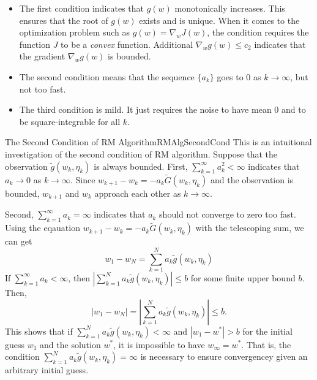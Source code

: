     \begin{itemize}
        \item The first condition indicates that $g(w)$ monotonically increases. This ensures that the root of $g(w)$ exists and is unique.
            When it comes to the optimization problem such as $g(w) = \nabla_w J(w)$, the condition requires the function $J$ to be a \emph{convex} function.
            Additional $\nabla_w g(w) \leq c_2$ indicates that the gradient $\nabla_w g(w)$ is bounded.
        \item The second condition means that the sequence $\{a_k\}$ goes to 0 as $k \to \infty$, but not too fast.
        \item The third condition is mild. It just requires the noise to have mean 0 and to be square-integrable for all $k$.
    \end{itemize}
    \begin{rem}{The Second Condition of RM Algorithm}{RMAlgSecondCond}
        This is an intuitional investigation of the second condition of RM algorithm. Suppose that the observation $\tilde{g}(w_k, \eta_k)$ is always bounded.
        First, $\sum_{k=1}^\infty a_k^2 < \infty$ indicates that $a_k \to 0$ as $k \to \infty$. Since $w_{k+1} - w_k = -a_k\tilde{G}(w_k, \eta_k)$ and the observation is bounded,
        $w_{k+1}$ and $w_k$ approach each other as $k \to \infty$.

        Second, $\sum_{k=1}^\infty a_k = \infty$ indicates that $a_k$ should not converge to zero too fast. Using the eqauation $w_{k+1} - w_k = -a_k\tilde{G}(w_k, \eta_k)$
        with the telescoping sum, we can get
        \begin{equation}
            w_1 - w_N = \sum_{k=1}^N a_k \tilde{g}(w_k, \eta_k)
        \end{equation}
        If $\sum_{k=1}^\infty a_k < \infty$, then $|\sum_{k=1}^N a_k \tilde{g}(w_k, \eta_k)| \leq b$ for some finite upper bound $b$. Then,
        \begin{equation}
            |w_1 - w_N| = |\sum_{k=1}^N a_k \tilde{g}(w_k, \eta_k)| \leq b.
        \end{equation}
        This shows that if $\sum_{k=1}^N a_k \tilde{g}(w_k, \eta_k) < \infty$ and $|w_1 - w^*| > b$ for the initial guess $w_1$ and the solution $w^*$, it is impossible to have $w_\infty = w^*$.
        That is, the condition $\sum_{k=1}^N a_k \tilde{g}(w_k, \eta_k) = \infty$ is necessary to ensure convergencey given an arbitrary initial guess.
    \end{rem}


